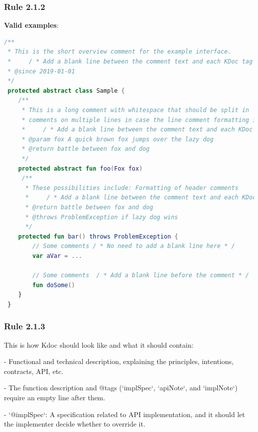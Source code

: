 \subsubsection*{\textbf{Rule 2.1.2}}
\leavevmode\newline



\textbf{Valid examples}:



\begin{lstlisting}[language=Kotlin]
/** 
 * This is the short overview comment for the example interface.
 *     / * Add a blank line between the comment text and each KDoc tag underneath * /
 * @since 2019-01-01
 */
 protected abstract class Sample {
    /**
     * This is a long comment with whitespace that should be split in 
     * comments on multiple lines in case the line comment formatting is enabled.
     *     / * Add a blank line between the comment text and each KDoc tag underneath * /
     * @param fox A quick brown fox jumps over the lazy dog
     * @return battle between fox and dog 
     */
    protected abstract fun foo(Fox fox)
     /**
      * These possibilities include: Formatting of header comments
      *     / * Add a blank line between the comment text and each KDoc tag underneath * /
      * @return battle between fox and dog
      * @throws ProblemException if lazy dog wins
      */
    protected fun bar() throws ProblemException {
        // Some comments / * No need to add a blank line here * /   
        var aVar = ...

        // Some comments  / * Add a blank line before the comment * /   
        fun doSome()
    }
 }
\end{lstlisting}


\subsubsection*{\textbf{Rule 2.1.3}}
\leavevmode\newline



This is how Kdoc should look like and what it should contain:

- Functional and technical description, explaining the principles, intentions, contracts, API, etc.

- The function description and @tags (`implSpec`, `apiNote`, and `implNote`) require an empty line after them.

- `@implSpec`: A specification related to API implementation, and it should let the implementer decide whether to override it.

